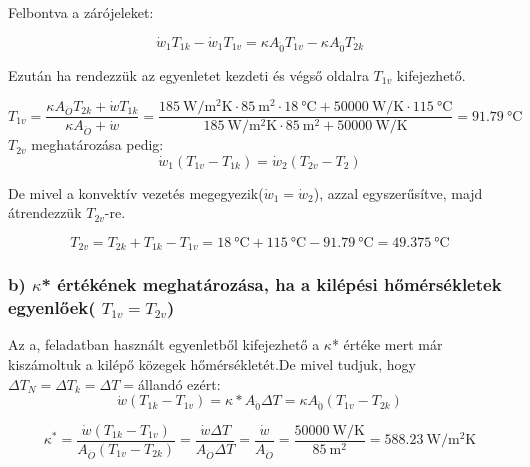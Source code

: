 Felbontva a zárójeleket:

 \begin{equation}
\dot{w}_1 T_{1k} - \dot{w}_1 T_{1v} =  \kappa A_{\ddot{0}} T_{1v} -  \kappa A_{\ddot{0}} T_{2k}
 \end{equation}


Ezután ha rendezzük az egyenletet kezdeti és végső oldalra $T_{1v}$ kifejezhető.

\begin{equation}
T_{1v} = \frac{\kappa A_{\ddot{O}} T_{2k} + \dot{w} T_{1k}}{\kappa A_{\ddot{O}} + \dot{w}} =\frac{\SI{185}{\watt\per\meter\squared\kelvin}\cdot \SI{85}{\meter\squared}\cdot \SI{18}{\celsius} + \SI{50000}{\watt\per\kelvin} \cdot \SI{115}{\celsius}}{\SI{185}{\watt\per\meter\squared\kelvin}\cdot \SI{85}{\meter\squared} + \SI{50000}{\watt\per\kelvin}}= \SI{91.79}{\celsius}
\end{equation}
$T_{2v}$ meghatározása pedig:
\begin{equation}
\dot{w}_1\left(T_{1v} - T_{1k}\right) = \dot{w}_2\left(T_{2v} - T_{2}\right)
\end{equation}

De mivel a konvektív vezetés megegyezik($\dot{w}_1 = \dot{w}_2$), azzal egyszerűsítve, majd átrendezzük $T_{2v}$-re.

\begin{equation}
T_{2v} = T_{2k} + T_{1k} - T_{1v} = \SI{18}{\celsius} + \SI{115}{\celsius} - \SI{91.79}{\celsius} = \SI{49.375}{\celsius}
\end{equation}

\subsubsection*{b) $\kappa$* értékének meghatározása, ha a kilépési hőmérsékletek egyenlőek( $T_{1v} = T_{2v}$) }
Az a, feladatban használt egyenletből kifejezhető a $\kappa$* értéke mert már kiszámoltuk a kilépő közegek hőmérsékletét.De mivel tudjuk, hogy $\Delta T_N = \Delta T_k = \Delta T = $állandó ezért:
\vspace{1mm}
\begin{equation}
\dot{w}\left(T_{1k} - T_{1v}\right) = \kappa* A_{\ddot{0}} \Delta T = \kappa A_{\ddot{0}} \left(T_{1v} - T_{2k}\right)
\end{equation}

\begin{equation}
\kappa^*=\dfrac{\dot{w} \left(T_{1k} - T_{1v}\right)}{A_{\ddot{O}} \left(T_{1v} - T_{2k}\right)} =\dfrac{\dot{w} \Delta T}{A_{\ddot{O}} \Delta T}=\dfrac{\dot{w}}{A_\ddot{O}}=\dfrac{\SI{50000}{\watt\per\kelvin}}{\SI{85}{\meter\squared}}=\SI{588.23}{\watt\per\meter\squared\kelvin}
\end{equation}
\vspace{5mm}
